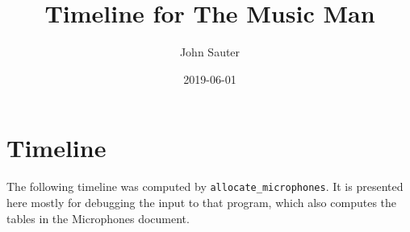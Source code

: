 \documentclass[letterpaper]{article}
\title{Timeline for The Music Man}
\author{John Sauter}
\date{2019-06-01}
\begin{document}
\maketitle
\newpage

\section {Timeline}
The following timeline was computed by {\tt allocate\_microphones}.
It is presented here mostly for debugging the input to that program,
which also computes the tables in the Microphones document.


\end{document}
